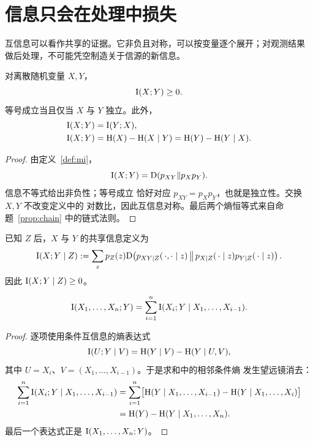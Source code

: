 \section{信息只会在处理中损失}\label{sec:information-properties}
\quad{}

\begin{strand}
互信息可以看作共享的证据。它非负且对称，可以按变量逐个展开；对观测结果
做后处理，不可能凭空制造关于信源的新信息。
\end{strand}

\begin{proposition}[互信息的性质]\label{prop:mi-properties}
对离散随机变量 $X,Y$，
\[
  \mathrm{I}(X;Y)\ge0.
\]
等号成立当且仅当 $X$ 与 $Y$ 独立。此外，
\begin{align*}
  \mathrm{I}(X;Y)&=\mathrm{I}(Y;X),\\
  \mathrm{I}(X;Y)&=\mathrm{H}(X)-\mathrm{H}(X\mid Y)
           =\mathrm{H}(Y)-\mathrm{H}(Y\mid X).
\end{align*}
\end{proposition}

\begin{proof}
由定义~\ref{def:mi}，
\[
  \mathrm{I}(X;Y)=\mathrm{D}(p_{XY}\Vert p_Xp_Y).
\]
信息不等式给出非负性；等号成立
恰好对应 $p_{XY}=p_Xp_Y$，也就是独立性。交换 $X,Y$ 不改变定义中的
对数比，因此互信息对称。最后两个熵恒等式来自命题~\ref{prop:chain}
中的链式法则。
\end{proof}

\begin{definition}[条件互信息]\label{def:conditional-mi}
已知 $Z$ 后，$X$ 与 $Y$ 的共享信息定义为
\[
  \mathrm{I}(X;Y\mid Z)
  :=\sum_zp_Z(z)\mathrm{D}\!\left(
    p_{XY\mid Z}(\,\cdot,\cdot\mid z)
    \,\middle\Vert\,
    p_{X\mid Z}(\,\cdot\mid z)p_{Y\mid Z}(\,\cdot\mid z)\right).
\]
因此 $\mathrm{I}(X;Y\mid Z)\ge0$。
\end{definition}

\begin{proposition}[互信息的链式法则]\label{prop:mi-chain}
\[
  \mathrm{I}(X_1,\ldots,X_n;Y)
  =\sum_{i=1}^n
    \mathrm{I}(X_i;Y\mid X_1,\ldots,X_{i-1}).
\]
\end{proposition}

\begin{proof}
逐项使用条件互信息的熵表达式
\[
  \mathrm{I}(U;Y\mid V)=\mathrm{H}(Y\mid V)-\mathrm{H}(Y\mid U,V),
\]
其中 $U=X_i$、$V=(X_1,\ldots,X_{i-1})$。于是求和中的相邻条件熵
发生望远镜消去：
\begin{align*}
  \sum_{i=1}^n\mathrm{I}(X_i;Y\mid X_1,\ldots,X_{i-1})
  &=\sum_{i=1}^n\bigl[
    \mathrm{H}(Y\mid X_1,\ldots,X_{i-1})
    -\mathrm{H}(Y\mid X_1,\ldots,X_i)\bigr]\\
  &=\mathrm{H}(Y)-\mathrm{H}(Y\mid X_1,\ldots,X_n).
\end{align*}
最后一个表达式正是 $\mathrm{I}(X_1,\ldots,X_n;Y)$。
\end{proof}

